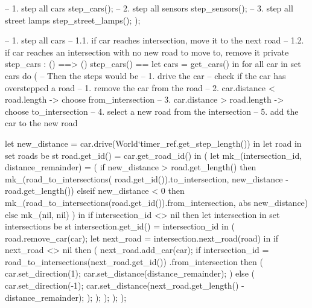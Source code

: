 \documentclass[a4paper]{article}
\begin{document}
\begin{vdm_al}
        -- 1. step all cars
        step_cars();
        -- 2. step all sensors
        step_sensors();
        -- 3. step all street lamps
        step_street_lamps();
    );

    -- 1. step all cars
    --    1.1. if car reaches intersection, move it to the next road
    --    1.2. if car reaches an intersection with no new road to move to, remove it
    private step_cars : () ==> ()
    step_cars() ==
        let cars = get_cars() in
        for all car in set cars do (
            -- Then the steps would be
            -- 1. drive the car
            -- check if the car has overstepped a road
            --     1. remove the car from the road
            --     2. car.distance < road.length -> choose from_intersection
            --     3. car.distance > road.length -> choose to_intersection
            --     4. select a new road from the intersection
            --     5. add the car to the new road
            
            let new_distance = car.drive(World`timer_ref.get_step_length()) in 
            let road in set roads be st road.get_id() = car.get_road_id() in (
            let mk_(intersection_id, distance_remainder) = (
                if new_distance > road.get_length() then
                    mk_(road_to_intersections(
                        road.get_id()).to_intersection,
                        new_distance - road.get_length())
                elseif new_distance < 0 then
                    mk_(road_to_intersections(road.get_id()).from_intersection,
                        abs new_distance)
                else mk_(nil, nil)
            ) in
                if intersection_id <> nil then
                    let intersection in set intersections
                    be st intersection.get_id() = intersection_id in (
                        road.remove_car(car);
                        let next_road = intersection.next_road(road) in
                        if next_road <> nil then (
                            next_road.add_car(car);
                            if intersection_id
                                = road_to_intersections(next_road.get_id())
                                .from_intersection then (
                                car.set_direction(1);
                                car.set_distance(distance_remainder);
                            ) else (
                                car.set_direction(-1);
                                car.set_distance(next_road.get_length() - distance_remainder);
                            );
                        );
                    );
            );
        );


\end{vdm_al}
\end{document}
